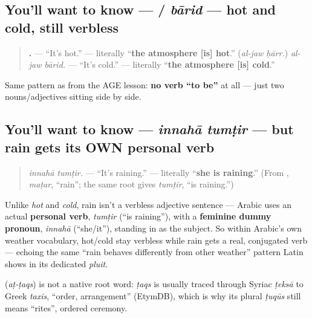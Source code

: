 \subsection*{You'll want to know —   / \emph{bārid} — hot and cold, still verbless}
\begin{quote}
\textbf{ .} — \textquotedblleft{}It's hot.\textquotedblright{} — literally \textquotedblleft{}\textbf{the atmosphere {[}is{]} hot}.\textquotedblright{} (\emph{al-jaw ḥārr.}) \emph{al-jaw bārid.} — \textquotedblleft{}It's cold.\textquotedblright{} — literally \textquotedblleft{}\textbf{the atmosphere {[}is{]} cold}.\textquotedblright{}
\end{quote}

Same pattern as \textbf{ } from the AGE lesson: \textbf{no verb \textquotedblleft{}to be\textquotedblright{}} at all — just two nouns/adjectives sitting side by side.

\subsection*{You'll want to know — \emph{innahā tumṭir} — but rain gets its OWN personal verb}
\begin{quote}
\emph{innahā tumṭir.} — \textquotedblleft{}It's raining.\textquotedblright{} — literally \textquotedblleft{}\textbf{she is raining}.\textquotedblright{} (From \textbf{}, \emph{maṭar}, \textquotedblleft{}rain\textquotedblright{}; the same root gives \emph{tumṭir}, \textquotedblleft{}is raining.\textquotedblright{})
\end{quote}

Unlike \emph{hot} and \emph{cold}, rain isn't a verbless adjective sentence — Arabic uses an actual \textbf{personal verb}, \emph{tumṭir} (\textquotedblleft{}is raining\textquotedblright{}), with a \textbf{feminine dummy pronoun}, \emph{innahā} (\textquotedblleft{}she/it\textquotedblright{}), standing in as the subject. So within Arabic's own weather vocabulary, hot/cold stay verbless while rain gets a real, conjugated verb — echoing the same \textquotedblleft{}rain behaves differently from other weather\textquotedblright{} pattern Latin shows in its dedicated \emph{pluit}.

\begin{cousinweb}
\textbf{} (\emph{aṭ-ṭaqs}) is not a native root word: \emph{ṭaqs} is usually traced through Syriac \emph{ṭeksā} to Greek \emph{taxis}, \textquotedblleft{}order, arrangement\textquotedblright{} (EtymDB), which is why its plural \emph{ṭuqūs} still means \textquotedblleft{}rites\textquotedblright{}, ordered ceremony.
\end{cousinweb}

